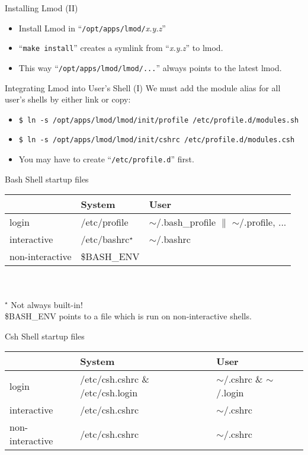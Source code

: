 \documentclass{beamer}
\begin{document}
\begin{frame}{Installing Lmod (II)}
  \begin{itemize}
    \item Install Lmod in ``\texttt{/opt/apps/lmod/}\emph{x.y.z}''
    \item ``\texttt{make install}'' creates a symlink from
      ``\emph{x.y.z}'' to lmod.
    \item This way ``\texttt{/opt/apps/lmod/lmod/...}'' always points
      to the latest lmod.
  \end{itemize}
\end{frame}

\begin{frame}{Integrating Lmod into User's Shell (I)}
    We must add the module alias for all user's shells by either link
    or copy:
    \begin{itemize}
      \item \texttt{\$ ln -s /opt/apps/lmod/lmod/init/profile /etc/profile.d/modules.sh}
      \item \texttt{\$ ln -s /opt/apps/lmod/lmod/init/cshrc   /etc/profile.d/modules.csh}
      \item You may have to create ``\texttt{/etc/profile.d}'' first.
  \end{itemize}
\end{frame}

\begin{frame}{Bash Shell startup files}
    \begin{tabular}{|l|l|l|}
        \hline
        ~           & System       & User \\\hline\hline
        login       & /etc/profile & $\sim$/.bash\_profile $\parallel$ $\sim$/.profile, ...\\\hline
        interactive & {\color{red}/etc/bashrc}$^\star$  & $\sim$/.bashrc\\\hline
        non-interactive & \$BASH\_ENV  & ~\\\hline
    \end{tabular}
    ~\\
    ~\\
    $^\star$ Not always built-in!\\
    \$BASH\_ENV points to a file which is run on  non-interactive shells.
\end{frame}

\begin{frame}{Csh Shell startup files}
{\small
    \begin{tabular}{|l|l|l|}
        \hline
        ~           & System       & User \\\hline\hline
        login       & /etc/csh.cshrc \& /etc/csh.login &  $\sim$/.cshrc  \& $\sim$/.login\\\hline
        interactive & /etc/csh.cshrc  & $\sim$/.cshrc\\\hline
        non-interactive & /etc/csh.cshrc & $\sim$/.cshrc~\\\hline
    \end{tabular}
}
\end{frame}
\end{document}
